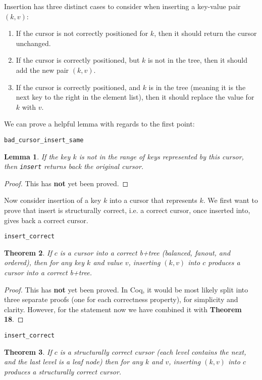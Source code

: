 \documentclass[12pt]{article}
\newtheorem{theorem}{Theorem}
\newtheorem{lemma}[theorem]{Lemma}
\begin{document}
Insertion has three distinct cases to consider when inserting a key-value pair $(k,v)$:
\begin{enumerate}
    \item If the cursor is not correctly positioned for $k$, then it should return the cursor unchanged.
    \item If the cursor is correctly positioned, but $k$ is not in the tree, then it should add the new pair $(k,v)$.
    \item If the cursor is correctly positioned, and $k$ is in the tree (meaning it is the next key to the right in the element list), then it should replace the value for $k$ with $v$.
\end{enumerate}

We can prove a helpful lemma with regards to the first point:

\bigskip
\texttt{bad\_cursor\_insert\_same}

\begin{lemma}
If the key $k$ is not in the range of keys represented by this cursor, then \texttt{insert} returns back the original cursor.
\end{lemma}

\begin{proof}
This has \textbf{not} yet been proved.
\end{proof}

Now consider insertion of a key $k$ into a cursor that represents $k$. We first want to prove that insert is structurally correct, i.e. a correct cursor, once inserted into, gives back a correct cursor.

\bigskip
\texttt{insert\_correct}

\begin{theorem}
If $c$ is a cursor into a correct b+tree (balanced, fanout, and ordered), then for any key $k$ and value $v$, inserting $(k,v)$ into $c$ produces a cursor into a correct b+tree.
\end{theorem}

\begin{proof}
This has \textbf{not} yet been proved. In Coq, it would be most likely split into three separate proofs (one for each correctness property), for simplicity and clarity. However, for the statement now we have combined it with \textbf{Theorem 18}.
\end{proof}

\bigskip
\texttt{insert\_correct}

\begin{theorem}
If $c$ is a structurally correct cursor (each level contains the next, and the last level is a leaf node) then for any $k$ and $v$, inserting $(k,v)$ into $c$ produces a structurally correct cursor.
\end{theorem}
\end{document}

